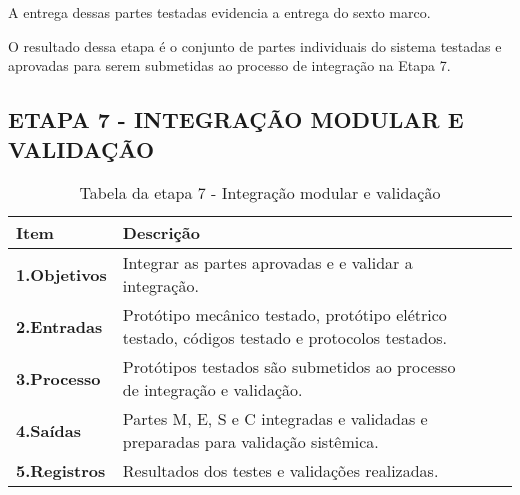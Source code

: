 	
A entrega dessas partes testadas evidencia a entrega do sexto marco. 
	
O resultado dessa etapa é o conjunto de partes individuais do sistema testadas e aprovadas para serem submetidas ao processo de integração na Etapa 7.\par





\clearpage
\subsection{ETAPA 7 - INTEGRAÇÃO MODULAR  E VALIDAÇÃO}

\begin{table}[htbp]
	\centering
	\caption{Tabela da etapa 7 - Integração modular e validação}
	\begin{tabular}{|l| p{13.5cm}| c| c| } \hline
		\textbf{Item} 	    & \textbf{Descrição} 
		\\ \hline
		\textbf{1.Objetivos}	   &  
		Integrar as partes aprovadas e e validar a integração.
		\\ \hline
		\textbf{2.Entradas}	  &		
		 Protótipo mecânico testado,  protótipo elétrico testado,  códigos testado e protocolos testados.
		\\ \hline	
		\textbf{3.Processo}     &
		Protótipos testados são submetidos ao processo de integração e validação.
		\\ \hline
		\textbf{4.Saídas}		& 
		Partes M, E, S e C integradas e validadas e preparadas para validação sistêmica. 
		\\ \hline
		\textbf{5.Registros}   & 
		Resultados dos testes e validações realizadas.
		\\ \hline
	\end{tabular}
	\label{T9}\par
\end{table}

